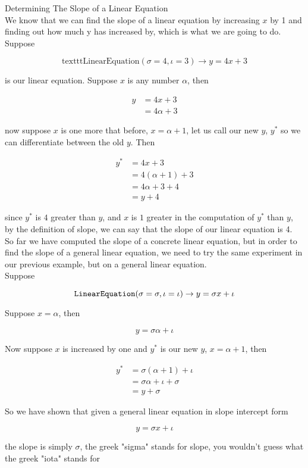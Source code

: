 \documentclass{book}
\begin{document}
  {\remark Determining The Slope of a Linear Equation \\
    We know that we can find the slope of a linear equation by increasing $x$ by 1 and finding out how much y has increased by, which is what we are going to do. Suppose

    $$\text{texttt{LinearEquation}}(\sigma = 4, \iota = 3) \to y = 4x + 3$$

    is our linear equation. Suppose $x$ is any number $\alpha$, then

    \begin{align*}
      y & = 4x + 3\\
      & = 4 \alpha + 3
    \end{align*}

    now suppose $x$ is one more that before, $x = \alpha + 1$, let us call our new $y$, $y^*$ so we can differentiate between the old $y$. Then

    \begin{align*}
      y^* & = 4x + 3\\
      & = 4(\alpha + 1) + 3\\
      & = 4\alpha + 3 + 4\\
      & = y + 4
    \end{align*}

    since $y^*$ is $4$ greater than $y$, and $x$ is $1$ greater in the computation of $y^*$ than $y$, by the definition of slope, we can say that the slope of our linear equation is 4.\\

    So far we have computed the slope of a concrete linear equation, but in order to find the slope of a general linear equation, we need to try the same experiment in our previous example, but on a general linear equation.\\

    Suppose

    $$\text{\texttt{LinearEquation}}(\sigma = \sigma, \iota = \iota) \to y = \sigma x + \iota$$

    Suppose $x = \alpha$, then

    $$y = \sigma \alpha + \iota$$

    Now suppose $x$ is increased by one and $y^*$ is our new $y$, $x = \alpha + 1$, then

    \begin{align*}
      y^* & = \sigma (\alpha + 1) + \iota\\
      & = \sigma \alpha + \iota + \sigma\\
      & = y + \sigma
    \end{align*}

    So we have shown that given a general linear equation in slope intercept form

    $$y = \sigma x + \iota$$

    the slope is simply $\sigma$, the greek "sigma" stands for slope, you wouldn't guess what the greek "iota" stands for\\
  }
\end{document}
